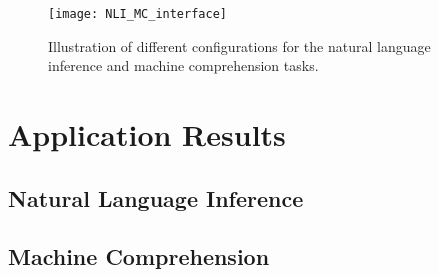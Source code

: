 \begin{figure*}[t]
\centering
\vspace{-2mm}
 \texttt{[image: NLI\_MC\_interface]}
  \vspace{-6mm}
 \caption{
Illustration of different configurations for the natural language inference and machine comprehension tasks.
}
\label{fig:pipelineUpdate}
\end{figure*}

\section{Application Results}


\subsection{Natural Language Inference}


\subsection{Machine Comprehension}
